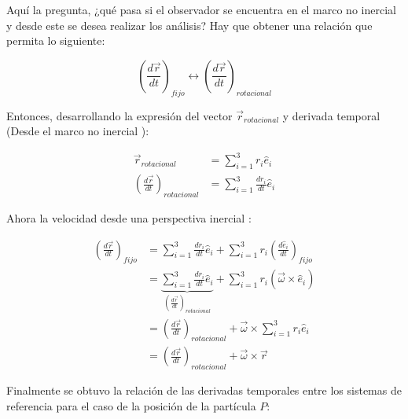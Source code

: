 \documentclass[/home/hernan-barquero/Documents/Apuntes_mecanica_teorica/main.tex]{subfiles}
\begin{document}
	Aquí la pregunta, ¿qué pasa si el observador se encuentra en el marco no inercial y desde este se desea realizar los análisis? Hay que obtener una relación que permita lo siguiente:

	\begin{equation*}
		\left( \frac{d \vec{r}}{dt} \right)_{fijo} \leftrightarrow \left( \frac{d \vec{r}}{dt} \right)_{rotacional}
	\end{equation*}

	Entonces, desarrollando la expresión del vector $\vec{r}_{rotacional}$ y derivada temporal (Desde el marco no inercial ):

	\begin{align*}
		\vec{r}_{rotacional} &= \sum_{i=1}^{3} r_{i}\hat{e}_{i} \\
		\left( \frac{d \vec{r}}{dt} \right)_{rotacional} &= \sum_{i=1}^{3} \frac{d r_{i}}{dt} \hat{e}_{i}
	\end{align*}

	Ahora la velocidad desde una perspectiva inercial :

	\begin{align*}
		\left( \frac{d \vec{r}}{dt} \right)_{fijo} &=  \sum_{i=1}^{3} \frac{d r_{i}}{dt} \hat{e}_{i} + \sum_{i=1}^{3} r_{i} \left( \frac{d \hat{e}_{i}}{dt}\right)_{fijo} \\ 
		&= \underbrace{\sum_{i=1}^{3} \frac{d r_{i}}{dt} \hat{e}_{i}}_{\left( \frac{d \vec{r}}{dt} \right)_{rotacional}} + \sum_{i=1}^{3} r_{i} \left(\vec{\omega} \times \hat{e}_{i} \right) \\
		&=  \left( \frac{d \vec{r}}{dt} \right)_{rotacional} + \vec{\omega} \times \sum_{i=1}^{3} r_{i} \hat{e}_{i} \\ 
		&= \left( \frac{d \vec{r}}{dt} \right)_{rotacional} + \vec{\omega} \times \vec{r}
	\end{align*}

	Finalmente se obtuvo la relación de las derivadas temporales entre los sistemas de referencia para el caso de la posición de la partícula $P$:
\end{document}
